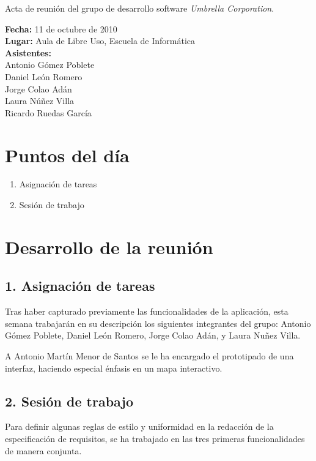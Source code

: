 \documentclass[a4paper,11pt,oneside]{article}
\begin{document}
\pagestyle{fancy}


\begin{center}
{\Large
Acta de reunión del grupo de desarrollo software \textit{Umbrella
Corporation}.}
\end{center}
\textbf{Fecha:} 11 de octubre de 2010\\
\textbf{Lugar:} Aula de Libre Uso, Escuela de Informática\\
\textbf{Asistentes:}\\
\hspace*{1cm}Antonio Gómez Poblete\\
\hspace*{1cm}Daniel León Romero\\
\hspace*{1cm}Jorge Colao Adán\\
\hspace*{1cm}Laura Núñez Villa\\
\hspace*{1cm}Ricardo Ruedas García


\section*{Puntos del día}

\begin{enumerate}
\item Asignación de tareas
\item Sesión de trabajo
\end{enumerate}


\section*{Desarrollo de la reunión}

\subsection*{1. Asignación de tareas}

Tras haber capturado previamente las funcionalidades de la aplicación, esta
semana trabajarán en su descripción los siguientes integrantes del grupo:
Antonio Gómez Poblete, Daniel León Romero, Jorge Colao Adán, y Laura Nuñez
Villa.

A Antonio Martín Menor de Santos se le ha encargado el prototipado de una
interfaz, haciendo especial énfasis en un mapa interactivo.

\subsection*{2. Sesión de trabajo}

Para definir algunas reglas de estilo y uniformidad en la redacción de la
especificación de requisitos, se ha trabajado en las tres primeras
funcionalidades de manera conjunta.
\end{document}
